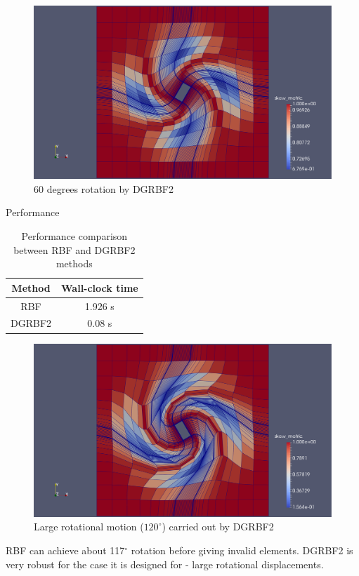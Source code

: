 \documentclass[t,12pt]{beamer}
\begin{document}
\begin{frame}
	 \begin{figure}
	 	\centering
	 	\includegraphics[scale=0.2]{qin-60-dgrbf2-quality.pdf}
	 	\caption{60 degrees rotation by DGRBF2}
	 	\label{fig:qin-60-dgrbf2}
	 \end{figure}
\end{frame}

\begin{frame}{Performance}
	\begin{table}[h!]
		\centering
		\begin{tabular}{|c|c|}
			\hline
			Method & Wall-clock time \\
			\hline
			RBF   &   1.926 s \\
			DGRBF2 &  0.08 s \\
			\hline
		\end{tabular}
		\caption{Performance comparison between RBF and DGRBF2 methods}
	\end{table}
\end{frame}

\begin{frame}
	\begin{figure}
		\centering
		\includegraphics[scale=0.2]{qin-120-quality-withmesh.pdf}
		\caption{Large rotational motion ($120^\circ$) carried out by DGRBF2}
		\label{fig:qin-dgrbf2-120}
	\end{figure}
	RBF can achieve about 117$^\circ$ rotation before giving invalid elements.
	DGRBF2 is very robust for the case it is designed for - large rotational displacements.
\end{frame}
\end{document}
